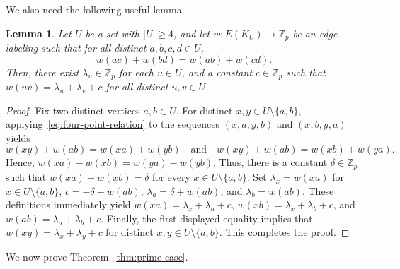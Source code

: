 \documentclass[11pt]{article}
\newtheorem{lemma}[theorem]{Lemma}
\theoremstyle{remark}
\newcommand{\Z}{\mathbb Z}
\begin{document}
We also need the following useful lemma.

\begin{lemma}\label{lem:transfer weight}
    Let $U$ be a set with $|U|\ge4$, and let $w \colon E(K_U)\to\Z_p$ be an edge-labeling such that for all distinct $a,b,c,d\in U$,
    \begin{equation}\label{eq:four-point-relation}
        w(ac)+w(bd)=w(ab)+w(cd).
    \end{equation}
    Then, there exist $\lambda_u\in\Z_p$ for each $u\in U$, and a constant $c\in\Z_p$ such that $w(uv)=\lambda_u+\lambda_v+c$ for all distinct $u,v\in U$.
\end{lemma}

\begin{proof}
    Fix two distinct vertices $a,b\in U$.  For distinct $x,y\in U\setminus\{a,b\}$, applying~\eqref{eq:four-point-relation} to the sequences $(x,a,y,b)$ and $(x,b,y,a)$ yields
    \[
        w(xy)+w(ab)=w(xa)+w(yb)
        \quad\text{and}\quad
        w(xy)+w(ab)=w(xb)+w(ya).
    \]
    Hence, $w(xa)-w(xb)=w(ya)-w(yb)$.
    Thus, there is a constant $\delta\in\Z_p$ such that $w(xa)-w(xb)=\delta$ for every $x\in U\setminus\{a,b\}$.
    Set $\lambda_x=w(xa)$ for $x\in U\setminus\{a,b\}$,
    $c=-\delta-w(ab)$, $\lambda_a=\delta+w(ab)$, and $\lambda_b=w(ab)$.
    These definitions immediately yield $w(xa)=\lambda_x+\lambda_a+c$, $w(xb)=\lambda_x+\lambda_b+c$, and $w(ab)=\lambda_a+\lambda_b+c$.  Finally, the first displayed equality implies that  $w(xy)=\lambda_x+\lambda_y+c$ for distinct $x,y\in U\setminus\{a,b\}$.  This completes the proof.
\end{proof}

We now prove Theorem~\ref{thm:prime-case}.
\end{document}
